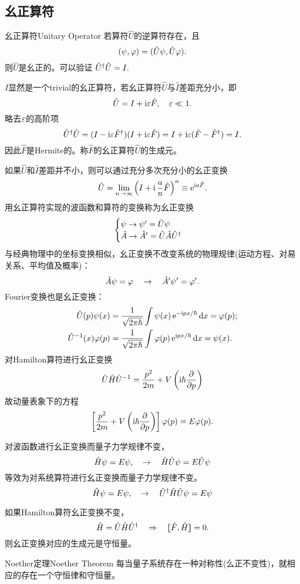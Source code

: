 \subsection{幺正算符}
\begin{definition}{幺正算符}{Unitary Operator}
	若算符$\hat U$的逆算符存在，且
	\[
		(\psi,\varphi)=(\hat U\psi,\hat U\varphi).
\]
	则$\hat U$是幺正的。可以验证
	$\hat U^\dagger\hat U=I.$
\end{definition}
$I$显然是一个trivial的幺正算符，若幺正算符$\hat U$与$\hat I$差距充分小，即
\[
	\hat U=I+\mathrm{i}\varepsilon\hat F,\quad\varepsilon\ll 1.
\]
略去$\varepsilon$的高阶项
\[
	\hat U^\dagger\hat U=(I-\mathrm{i}\varepsilon\hat F^\dagger)(I+\mathrm{i}\varepsilon\hat F)=I+\mathrm{i}\varepsilon(\hat F-\hat F^\dagger)=I.
\]
因此$\hat F$是Hermite的。称$\hat F$的幺正算符$\hat U$的生成元。

如果$\hat U$和$\hat I$差距并不小，则可以通过充分多次充分小的幺正变换
\begin{align}
	\hat U=\lim_{n\to\infty}\left(I+\mathrm{i}\,\frac an\hat F\right)^n\equiv\mathop{}\!\mathrm{e}^{\mathrm{i} a\hat F}.
\end{align}
用幺正算符实现的波函数和算符的变换称为幺正变换
\begin{align}
	\begin{cases}
		\psi\to\psi'=\hat U\psi\\
		\hat A\to\hat A'=\hat U\hat A\hat U^\dagger
	\end{cases}
\end{align}
与经典物理中的坐标变换相似，幺正变换不改变系统的物理规律(运动方程、对易关系、平均值及概率)：
\[
	\hat A\psi=\varphi\quad\to\quad\hat A'\psi'=\varphi'.
\]
Fourier变换也是幺正变换：
\begin{align}
	\hat U(p)\psi(x)&=\frac1{\sqrt{2\pi\hbar}}\int\psi(x)\mathop{}\!\mathrm{e}^{-\mathrm{i} px/\hbar}\mathop{}\!\mathrm{d} x=\varphi(p);\\
	\hat U^{-1}(x)\varphi(p)&=\frac1{\sqrt{2\pi\hbar}}\int\varphi(p)\mathop{}\!\mathrm{e}^{\mathrm{i} px/\hbar}\mathop{}\!\mathrm{d} x=\psi(x).
\end{align}
对Hamilton算符进行幺正变换
\begin{align}
	\hat U\hat H\hat U^{-1}=\frac{p^2}{2m}+V\left(\mathrm{i}\hbar\frac{\partial^{\;\!\!}}{\partial p^{\;\!\!}}\right)
\end{align}
故动量表象下的\Schr 方程 
\begin{align}
	\left[\frac{p^2}{2m}+V\left(\mathrm{i}\hbar\frac{\partial^{\;\!\!}}{\partial p^{\;\!\!}}\right)\right]\varphi(p)=E\varphi(p).
\end{align}

对波函数进行幺正变换而量子力学规律不变，
\[
	\hat H\psi=E\psi,\quad\to\quad\hat H\hat U\psi=E\hat U\psi
\]
等效为对系统算符进行幺正变换而量子力学规律不变。
\[
	\hat H\psi=E\psi,\quad\to\quad\hat U^\dagger\hat H\hat U\psi=E\psi
\]

如果Hamilton算符幺正变换不变，
\[
	\hat H=\hat U\hat H\hat U^\dagger\quad\Rightarrow\quad\lfloor\hspace{-4.7 pt}\lceil \hat F,\hat H\rceil\hspace{-4.7 pt}\rfloor=0.
\]
则幺正变换对应的生成元是守恒量。
\begin{theorem}{Noether定理}{Noether Theorem}
	每当量子系统存在一种对称性(么正不变性)，就相应的存在一个守恒律和守恒量。
\end{theorem}

